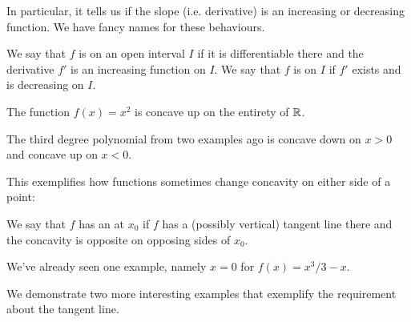 In particular, it tells us if the slope (i.e. derivative) is an increasing or decreasing function.
We have fancy names for these behaviours.

\begin{definition}[Concavity]
	We say that $f$ is  on an open interval $I$ if it is differentiable there and the derivative $f'$ is an increasing function on $I$.
	We say that $f$ is  on $I$ if $f'$ exists and is decreasing on $I$.
\end{definition}

\begin{example}
	The function $f(x) = x^2$ is concave up on the entirety of $\mathbb{R}$.
\end{example}

\begin{example}
	The third degree polynomial from two examples ago is concave down on $x > 0$ and concave up on $x < 0$.
\end{example}

\noindent
This exemplifies how functions sometimes change concavity on either side of a point:

\begin{definition}
	We say that $f$ has an  at $x_0$ if $f$ has a (possibly vertical) tangent line there and the concavity is opposite on opposing sides of $x_0$.
\end{definition}

\noindent
We've already seen one example, namely $x = 0$ for $f(x) = x^3 / 3 - x$.

We demonstrate two more interesting examples that exemplify the requirement about the tangent line.

